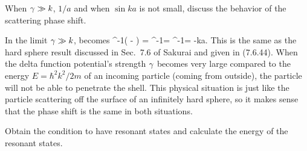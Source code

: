 \begin{problem}
	When $\gamma \gg k$, $1/a$ and when $\sin ka$ is not small, discuss the behavior of the scattering phase shift.
\end{problem}

\begin{solution}
	In the limit $\gamma \gg k$,  becomes
	\beq
		\delo \to \tan^{-1}\!\!\left( - \right)
		= \tan^{-1}\!
		= \tan^{-1}\!
		= -ka.
	\eeq
	This is the same as the hard sphere result discussed in Sec.~7.6 of Sakurai and given in (7.6.44).  When the delta function potential's strength $\gamma$ becomes very large compared to the energy $E = \hbar^2 k^2 / 2m$ of an incoming particle (coming from outside), the particle will not be able to penetrate the shell.  This physical situation is just like the particle scattering off the surface of an infinitely hard sphere, so it makes sense that the phase shift is the same in both situations.
\end{solution}



\begin{problem}
	Obtain the condition to have resonant states and calculate the energy of the resonant states.
\end{problem}

